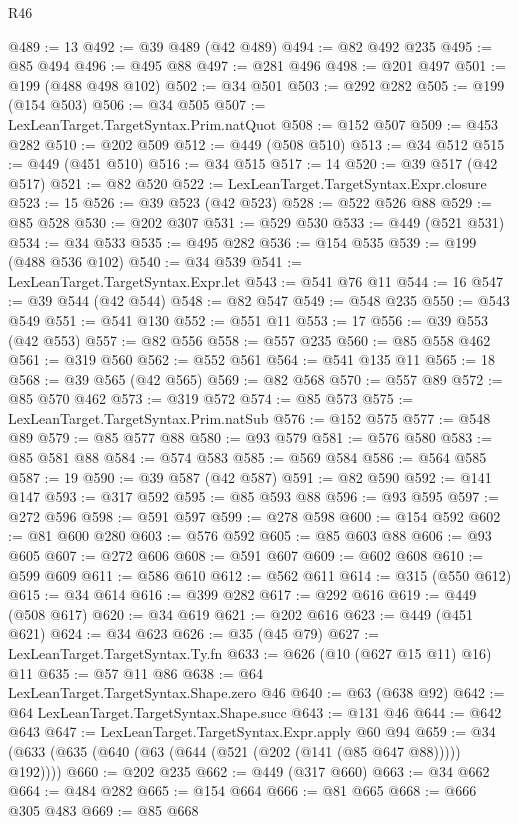 \begin{lexlean}{R46}
\begin{coremodule}
@489 := 13
@492 := @39 @489 (@42 @489)
@494 := @82 @492 @235
@495 := @85 @494
@496 := @495 @88
@497 := @281 @496
@498 := @201 @497
@501 := @199 (@488 @498 @102)
@502 := @34 @501
@503 := @292 @282
@505 := @199 (@154 @503)
@506 := @34 @505
@507 := LexLeanTarget.TargetSyntax.Prim.natQuot
@508 := @152 @507
@509 := @453 @282
@510 := @202 @509
@512 := @449 (@508 @510)
@513 := @34 @512
@515 := @449 (@451 @510)
@516 := @34 @515
@517 := 14
@520 := @39 @517 (@42 @517)
@521 := @82 @520
@522 := LexLeanTarget.TargetSyntax.Expr.closure
@523 := 15
@526 := @39 @523 (@42 @523)
@528 := @522 @526 @88
@529 := @85 @528
@530 := @202 @307
@531 := @529 @530
@533 := @449 (@521 @531)
@534 := @34 @533
@535 := @495 @282
@536 := @154 @535
@539 := @199 (@488 @536 @102)
@540 := @34 @539
@541 := LexLeanTarget.TargetSyntax.Expr.let
@543 := @541 @76 @11
@544 := 16
@547 := @39 @544 (@42 @544)
@548 := @82 @547
@549 := @548 @235
@550 := @543 @549
@551 := @541 @130
@552 := @551 @11
@553 := 17
@556 := @39 @553 (@42 @553)
@557 := @82 @556
@558 := @557 @235
@560 := @85 @558 @462
@561 := @319 @560
@562 := @552 @561
@564 := @541 @135 @11
@565 := 18
@568 := @39 @565 (@42 @565)
@569 := @82 @568
@570 := @557 @89
@572 := @85 @570 @462
@573 := @319 @572
@574 := @85 @573
@575 := LexLeanTarget.TargetSyntax.Prim.natSub
@576 := @152 @575
@577 := @548 @89
@579 := @85 @577 @88
@580 := @93 @579
@581 := @576 @580
@583 := @85 @581 @88
@584 := @574 @583
@585 := @569 @584
@586 := @564 @585
@587 := 19
@590 := @39 @587 (@42 @587)
@591 := @82 @590
@592 := @141 @147
@593 := @317 @592
@595 := @85 @593 @88
@596 := @93 @595
@597 := @272 @596
@598 := @591 @597
@599 := @278 @598
@600 := @154 @592
@602 := @81 @600 @280
@603 := @576 @592
@605 := @85 @603 @88
@606 := @93 @605
@607 := @272 @606
@608 := @591 @607
@609 := @602 @608
@610 := @599 @609
@611 := @586 @610
@612 := @562 @611
@614 := @315 (@550 @612)
@615 := @34 @614
@616 := @399 @282
@617 := @292 @616
@619 := @449 (@508 @617)
@620 := @34 @619
@621 := @202 @616
@623 := @449 (@451 @621)
@624 := @34 @623
@626 := @35 (@45 @79)
@627 := LexLeanTarget.TargetSyntax.Ty.fn
@633 := @626 (@10 (@627 @15 @11) @16) @11
@635 := @57 @11 @86
@638 := @64 LexLeanTarget.TargetSyntax.Shape.zero @46
@640 := @63 (@638 @92)
@642 := @64 LexLeanTarget.TargetSyntax.Shape.succ
@643 := @131 @46
@644 := @642 @643
@647 := LexLeanTarget.TargetSyntax.Expr.apply @60 @94
@659 := @34 (@633 (@635 (@640 (@63 (@644 (@521 (@202 (@141 (@85 @647 @88))))) @192))))
@660 := @202 @235
@662 := @449 (@317 @660)
@663 := @34 @662
@664 := @484 @282
@665 := @154 @664
@666 := @81 @665
@668 := @666 @305 @483
@669 := @85 @668

\end{coremodule}
\end{lexlean}
